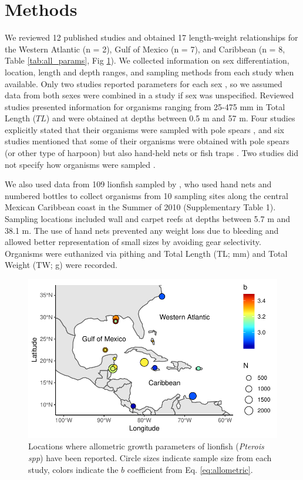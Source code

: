 \documentclass[fleqn,10pt,lineno]{wlpeerj} %
\begin{document}
\section*{Methods}

We reviewed 12 published studies and obtained 17 length-weight
relationships for the Western Atlantic (n = 2), Gulf of Mexico (n = 7),
and Caribbean (n = 8, Table \ref{tab:all_params}, Fig \ref{fig:map}). We
collected information on sex differentiation, location, length and depth
ranges, and sampling methods from each study when available. Only two
studies reported parameters for each sex
\citep{aguilarperera_2016,fogg_2013}, so we assumed data from both sexes
were combined in a study if sex was unspecified. Reviewed studies
presented information for organisms ranging from 25-475 mm in Total
Length (\(TL\)) and were obtained at depths between 0.5 m and 57 m. Four
studies explicitly stated that their organisms were sampled with pole
spears \citep{dahl_2014,aguilarperera_2016,chin_2016,sabidoitz_2016},
and six studies mentioned that some of their organisms were obtained
with pole spears (or other type of harpoon) but also hand-held nets or
fish traps
\citep{barbour_2011,fogg_2013,edwards_2014,toledohernndez_2014,sandel_2015,sabidoitza_2016}.
Two studies did not specify how organisms were sampled
\citep{darling_2011,deleon_2013}.

We also used data from 109 lionfish sampled by
\citet{villaseorderbez_2014}, who used hand nets and numbered bottles to
collect organisms from 10 sampling sites along the central Mexican
Caribbean coast in the Summer of 2010 (Supplementary Table 1). Sampling
locations included wall and carpet reefs at depths between 5.7 m and
38.1 m. The use of hand nets prevented any weight loss due to bleeding
and allowed better representation of small sizes by avoiding gear
selectivity. Organisms were euthanized via pithing and Total Length (TL;
mm) and Total Weight (TW; g) were recorded.

\clearpage

\begin{figure}
\centering
\includegraphics{Manuscript_files/figure-latex/map-1.pdf}
\caption{\label{fig:map}Locations where allometric growth parameters of
lionfish (\emph{Pterois spp}) have been reported. Circle sizes indicate
sample size from each study, colors indicate the \(b\) coefficient from
Eq. \ref{eq:allometric}.}
\end{figure}
\end{document}
